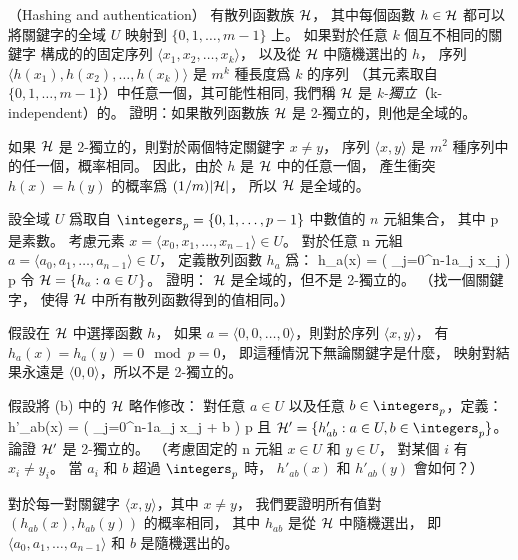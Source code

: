 \startPROBLEM
（Hashing and authentication）
有散列函數族 ${\cal H}$，
其中每個函數 $h\in{\cal H}$ 都可以
將關鍵字的全域 $U$ 映射到 $\{0,1,\ldots,m-1\}$ 上。
如果對於任意 $k$ 個互不相同的關鍵字
構成的的固定序列 $\langle x_1,x_2,\ldots,x_k \rangle$，
以及從 ${\cal H}$ 中隨機選出的 $h$，
序列 $\langle h(x_1),h(x_2),\ldots,h(x_k) \rangle$
 是 $m^k$ 種長度爲 $k$ 的序列
（其元素取自 $\{0,1,\ldots,m-1\}$）中任意一個，其可能性相同,
我們稱 ${\cal H}$ 是 \emph{k-獨立}（k-independent）的。
\startigBase[a]\startitem%
證明：如果散列函數族 ${\cal H}$ 是 2-獨立的，則他是全域的。
\stopitem\stopigBase

\startANSWER
如果 ${\cal H}$ 是 2-獨立的，則對於兩個特定關鍵字 $x\ne y$，
序列 $\langle x, y\rangle$ 是 $m^2$ 種序列中的任一個，概率相同。
因此，由於 $h$ 是 ${\cal H}$ 中的任意一個，
產生衝突 $h(x) = h(y)$ 的概率爲 $(1/m)|{\cal H}|$，
所以 ${\cal H}$ 是全域的。
\stopANSWER

\startigBase[continue]\startitem%
設全域 $U$ 爲取自 $\integers_p = \{0,1,\ldots,p-1\}$ 中數值的 $n$ 元組集合，
其中 p 是素數。
考慮元素 $x=\langle x_0,x_1,\ldots,x_{n-1} \rangle \in U$。
對於任意 n 元組 $a=\langle a_0,a_1,\ldots,a_{n-1} \rangle \in U$，
定義散列函數 $h_a$ 爲：
\startformula
h_a(x) = \left( \sum_{j=0}^{n-1}a_j x_j \right) \mod p
\stopformula
令 ${\cal H}=\{h_a: a\in U\}$。
證明： ${\cal H}$ 是全域的，但不是 2-獨立的。
（\hint 找一個關鍵字，
使得 ${\cal H}$ 中所有散列函數得到的值相同。）
\stopitem\stopigBase

\startANSWER
假設在 ${\cal H}$ 中選擇函數 $h$，
如果 $a=\langle 0,0,\ldots,0\rangle$，則對於序列 $\langle x,y\rangle$，
有 $h_a(x)=h_a(y) = 0 \mod p = 0$，
即這種情況下無論關鍵字是什麼，
映射對結果永遠是 $\langle 0,0\rangle$，所以不是 2-獨立的。
\stopANSWER

\startigBase[continue]\startitem%
假設將 (b) 中的 ${\cal H}$ 略作修改：
對任意 $a\in U$ 以及任意 $b\in\integers_p$，定義：
\startformula
h'_{ab}(x) = \left( \sum_{j=0}^{n-1}a_j x_j + b \right) \mod p
\stopformula
且 ${\cal H}'=\{h'_{ab}: a \in U, b\in\integers_p\}$。
論證 ${\cal H}'$ 是 2-獨立的。
（\hint 考慮固定的 n 元組 $x\in U$ 和 $y\in U$，
對某個 $i$ 有 $x_i\ne y_i$。
當 $a_i$ 和 $b$ 超過 $\integers_p$ 時，
 $h'_{ab}(x)$ 和 $h'_{ab}(y)$ 會如何？）
\stopitem\stopigBase

\startANSWER
對於每一對關鍵字 $\langle x,y\rangle$，其中 $x\ne y$，
我們要證明所有值對 $(h_{ab}(x),h_{ab}(y))$ 的概率相同，
其中 $h_{ab}$ 是從 ${\cal H}$ 中隨機選出，
即 $\langle a_0,a_1,\ldots,a_{n-1}\rangle$ 和 $b$ 是隨機選出的。

